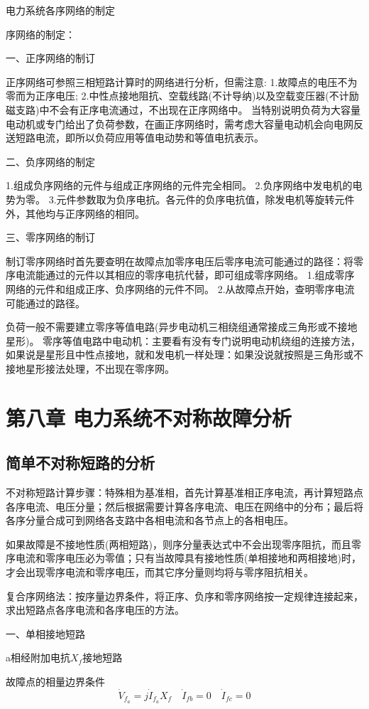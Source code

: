 \documentclass[UTF8, 12pt, a4paper]{ctexart}
\begin{document}
电力系统各序网络的制定

序网络的制定：

一、正序网络的制订

正序网络可参照三相短路计算时的网络进行分析，但需注意:
1.故障点的电压不为零而为正序电压;
2.中性点接地阻抗、空载线路(不计导纳)以及空载变压器(不计励磁支路)中不会有正序电流通过，不出现在正序网络中。
当特别说明负荷为大容量电动机或专门给出了负荷参数，在画正序网络时，需考虑大容量电动机会向电网反送短路电流，即所以负荷应用等值电动势和等值电抗表示。

二、负序网络的制定

1.组成负序网络的元件与组成正序网络的元件完全相同。
2.负序网络中发电机的电势为零。
3.元件参数取为负序电抗。各元件的负序电抗值，除发电机等旋转元件外，其他均与正序网络的相同。

三、零序网络的制订

制订零序网络时首先要查明在故障点加零序电压后零序电流可能通过的路径：将零序电流能通过的元件以其相应的零序电抗代替，即可组成零序网络。
1.组成零序网络的元件和组成正序、负序网络的元件不同。
2.从故障点开始，查明零序电流可能通过的路径。

负荷一般不需要建立零序等值电路(异步电动机三相绕组通常接成三角形或不接地星形)。
零序等值电路中电动机：主要看有没有专门说明电动机绕组的连接方法，如果说是星形且中性点接地，就和发电机一样处理：如果没说就按照是三角形或不接地星形接法处理，不出现在零序网。
\newpage{}
\section{第八章{} 电力系统不对称故障分析}
\subsection{简单不对称短路的分析}
不对称短路计算步骤：特殊相为基准相，首先计算基准相正序电流，再计算短路点各序电流、电压分量；然后根据需要计算各序电流、电压在网络中的分布；最后将各序分量合成可到网络各支路中各相电流和各节点上的各相电压。

如果故障是不接地性质(两相短路)，则序分量表达式中不会出现零序阻抗，而且零序电流和零序电压必为零值；只有当故障具有接地性质(单相接地和两相接地)时，才会出现零序电流和零序电压，而其它序分量则均将与零序阻抗相关。

复合序网络法：按序量边界条件，将正序、负序和零序网络按一定规律连接起来，求出短路点各序电流和各序电压的方法。

一、单相接地短路

a相经附加电抗$X_f$接地短路

故障点的相量边界条件
\[ \dot { V } _ { f _ { a } } = j \dot { I } _ { f _ { a } } X _ { f }\quad \dot { I } _ { f b } = 0\quad \dot { I } _ { f c } = 0 \]
\end{document}

